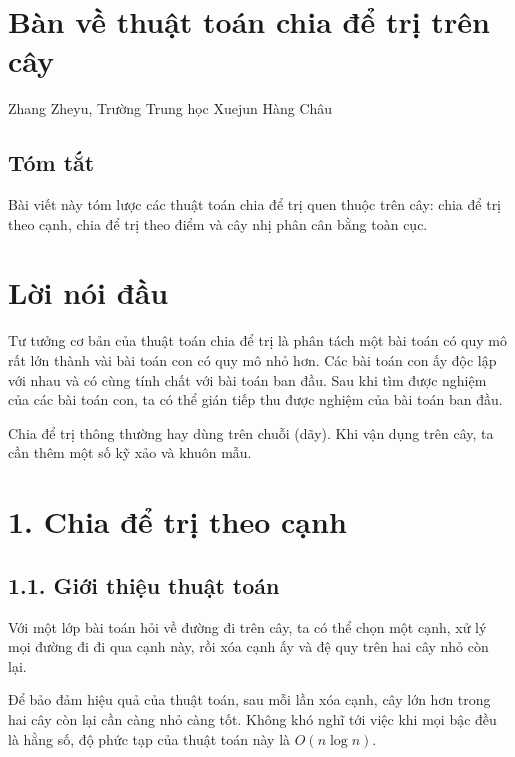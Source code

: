 \documentclass[11pt]{article}
\begin{document}
\clearpage
\section*{Bàn về thuật toán chia để trị trên cây}

\begin{center}
Zhang Zheyu, Trường Trung học Xuejun Hàng Châu
\end{center}

\subsection*{Tóm tắt}

Bài viết này tóm lược các thuật toán chia để trị quen thuộc trên cây: chia để
trị theo cạnh, chia để trị theo điểm và cây nhị phân cân bằng toàn cục.

\section*{Lời nói đầu}

Tư tưởng cơ bản của thuật toán chia để trị là phân tách một bài toán có quy mô
rất lớn thành vài bài toán con có quy mô nhỏ hơn. Các bài toán con ấy độc lập
với nhau và có cùng tính chất với bài toán ban đầu. Sau khi tìm được nghiệm
của các bài toán con, ta có thể gián tiếp thu được nghiệm của bài toán ban
đầu.

Chia để trị thông thường hay dùng trên chuỗi (dãy). Khi vận dụng trên cây, ta
cần thêm một số kỹ xảo và khuôn mẫu.

\section*{1. Chia để trị theo cạnh}

\subsection*{1.1. Giới thiệu thuật toán}

Với một lớp bài toán hỏi về đường đi trên cây, ta có thể chọn một cạnh, xử lý
mọi đường đi đi qua cạnh này, rồi xóa cạnh ấy và đệ quy trên hai cây nhỏ còn
lại.

Để bảo đảm hiệu quả của thuật toán, sau mỗi lần xóa cạnh, cây lớn hơn trong
hai cây còn lại cần càng nhỏ càng tốt. Không khó nghĩ tới việc khi mọi bậc đều
là hằng số, độ phức tạp của thuật toán này là \(O(n\log n)\).
\end{document}
